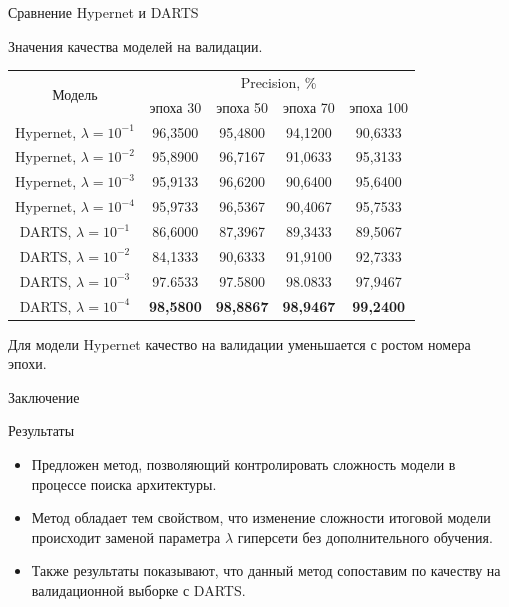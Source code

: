 \documentclass{beamer}
\begin{document}
\begin{frame}{Сравнение Hypernet и DARTS}
\begin{center}
Значения качества моделей на валидации.
\begin{table}[H]
	\begin{tabular}{ |c|c|c|c|c| }
	\hline
	 \multirow{2}{*}{Модель} & \multicolumn{4}{c|}{Precision, \%} \\ \cline{2-5}
	 		& эпоха 30 & эпоха 50 & эпоха 70 & эпоха 100\\
	 \hline
 	Hypernet, $\lambda = 10^{-1}$ &96,3500 & 95,4800 & 94,1200 & 90,6333  \\ 
 	Hypernet, $\lambda = 10^{-2}$ &95,8900 & 96,7167& 91,0633 & 95,3133 \\ 
 	Hypernet, $\lambda = 10^{-3}$ &95,9133 & 96,6200 & 90,6400 & 95,6400 \\ 
 	Hypernet, $\lambda = 10^{-4}$ &95,9733 & 96,5367 & 90,4067 & 95,7533\\
 	\hline
 	DARTS, $\lambda = 10^{-1}$ &86,6000 &87,3967 & 89,3433 & 89,5067 \\
 	DARTS, $\lambda = 10^{-2}$ & 84,1333 & 90,6333 &91,9100 & 92,7333\\
 	DARTS, $\lambda = 10^{-3}$ &97.6533 & 97.5800 & 98.0833 & 97,9467 \\
 	DARTS, $\lambda = 10^{-4}$ & \textbf{98,5800} &  \textbf{98,8867}&\textbf{98,9467}&\textbf{99,2400} \\
 	\hline
\end{tabular}
\end{table}
\end{center}

Для модели Hypernet качество на валидации уменьшается с ростом номера эпохи.

\end{frame}
\begin{frame}{Заключение}
    \begin{block}{Результаты}
    \begin{itemize}
        \item Предложен метод, позволяющий контролировать сложность модели в процессе поиска архитектуры.
        \item Метод обладает тем свойством, что изменение сложности итоговой модели происходит заменой параметра $\lambda$ гиперсети без дополнительного обучения.
        \item Также результаты показывают, что данный метод сопоставим по качеству на валидационной выборке с DARTS.
    \end{itemize}
    \end{block}
\end{frame}
\end{document}
